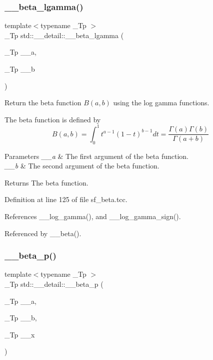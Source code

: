 \subsubsection{\texorpdfstring{\+\_\+\+\_\+beta\+\_\+lgamma()}{\_\_beta\_lgamma()}}
{\footnotesize\ttfamily template$<$typename \+\_\+\+Tp $>$ \\
\+\_\+\+Tp std\+::\+\_\+\+\_\+detail\+::\+\_\+\+\_\+beta\+\_\+lgamma (\begin{DoxyParamCaption}\item[{\+\_\+\+Tp}]{\+\_\+\+\_\+a,  }\item[{\+\_\+\+Tp}]{\+\_\+\+\_\+b }\end{DoxyParamCaption})}



Return the beta function $B(a,b)$ using the log gamma functions. 

The beta function is defined by \[ B(a,b) = \int_0^1 t^{a - 1} (1 - t)^{b - 1} dt = \frac{\Gamma(a)\Gamma(b)}{\Gamma(a+b)} \]


\begin{DoxyParams}{Parameters}
{\em \+\_\+\+\_\+a} & The first argument of the beta function. \\
\hline
{\em \+\_\+\+\_\+b} & The second argument of the beta function. \\
\hline
\end{DoxyParams}
\begin{DoxyReturn}{Returns}
The beta function. 
\end{DoxyReturn}


Definition at line 125 of file sf\+\_\+beta.\+tcc.



References \+\_\+\+\_\+log\+\_\+gamma(), and \+\_\+\+\_\+log\+\_\+gamma\+\_\+sign().



Referenced by \+\_\+\+\_\+beta().

\mbox{\label{namespacestd_1_1____detail_ae1ebc99ce7ff6bf261b519ab293f4fd6}} 
\subsubsection{\texorpdfstring{\+\_\+\+\_\+beta\+\_\+p()}{\_\_beta\_p()}}
{\footnotesize\ttfamily template$<$typename \+\_\+\+Tp $>$ \\
\+\_\+\+Tp std\+::\+\_\+\+\_\+detail\+::\+\_\+\+\_\+beta\+\_\+p (\begin{DoxyParamCaption}\item[{\+\_\+\+Tp}]{\+\_\+\+\_\+a,  }\item[{\+\_\+\+Tp}]{\+\_\+\+\_\+b,  }\item[{\+\_\+\+Tp}]{\+\_\+\+\_\+x }\end{DoxyParamCaption})}



